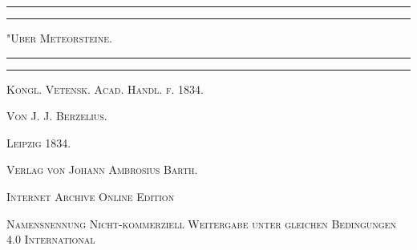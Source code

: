 \documentclass[a4paper, 11pt, oneside]{article}
\begin{document}
\swabfamily
\renewcommand{\contentsname}{
\swabfamily{Inhaltsverzeichnis}
}

\renewcommand{\cftsecfont}{\swabfamily}
\renewcommand{\cftsubsecfont}{\swabfamily}
\renewcommand{\cftsubsubsecfont}{\swabfamily}

\renewcommand\thefootnote{\swabfamily{\arabic{footnote}}}

\begin{titlepage} %
	\centering %

	
	\rule{\textwidth}{1.6pt}\vspace*{-\baselineskip}\vspace*{2pt} %
	\rule{\textwidth}{0.4pt} %
	
	\vspace{1\baselineskip} %
	
	{\scshape\Huge "Uber Meteorsteine.\\[1.25pt]}
	
	\vspace{1\baselineskip} %

	\rule{\textwidth}{0.4pt}\vspace*{-\baselineskip}\vspace{3.2pt} %
	\rule{\textwidth}{1.6pt} %
	
	\vspace{1\baselineskip} %
	
	
	{\Large\scshape Kongl. Vetensk. Acad. Handl. f. 1834.} %
	
	\vspace*{1\baselineskip} %
	
    {\scshape\Large Von J. J. Berzelius.} %
    
    \vspace*{\fill}

	\vspace{1\baselineskip}

	{\Large\scshape Leipzig 1834.}
	
	{\Large\scshape{Verlag von Johann Ambrosius Barth.}}
	
	\vspace{0.5\baselineskip} %

    \scshape\Large Internet Archive Online Edition  %
	
	{\scshape\Large Namensnennung Nicht-kommerziell Weitergabe unter gleichen Bedingungen 4.0 International} %
\end{titlepage}
\end{document}
